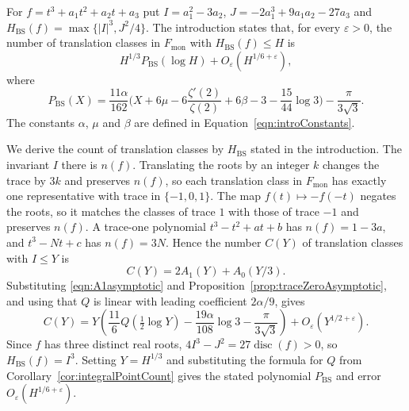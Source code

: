 \begin{remarknode}

\label{rem:translationClasses}


\leanok

For $f=t^3+a_1t^2+a_2t+a_3$ put $I=a_1^2-3a_2$, $J=-2a_1^3+9a_1a_2-27a_3$ and $H_{\mathrm{BS}}(f)=\max\{|I|^3,J^2/4\}$. The introduction states that, for every $\varepsilon>0$, the number of translation classes in $F_{\mathrm{mon}}$ with $H_{\mathrm{BS}}(f)\leq H$ is \[H^{1/3}P_{\mathrm{BS}}(\log H)+O_\varepsilon(H^{1/6+\varepsilon}),\] where \[P_{\mathrm{BS}}(X)=\frac{11\alpha}{162}\biggl(X+6\mu-6\frac{\zeta'(2)}{\zeta(2)}+6\beta-3-\frac{15}{44}\log3\biggr)-\frac{\pi}{3\sqrt3}.\] The constants $\alpha$, $\mu$ and $\beta$ are defined in Equation~\ref{eqn:introConstants}.

 We derive the count of translation classes by $H_{\mathrm{BS}}$ stated in the introduction. The invariant $I$ there is $n(f)$. Translating the roots by an integer $k$ changes the trace by $3k$ and preserves $n(f)$, so each translation class in $F_{\mathrm{mon}}$ has exactly one representative with trace in $\{-1,0,1\}$. The map $f(t)\mapsto-f(-t)$ negates the roots, so it matches the classes of trace $1$ with those of trace $-1$ and preserves $n(f)$. A trace-one polynomial $t^3-t^2+at+b$ has $n(f)=1-3a$, and $t^3-Nt+c$ has $n(f)=3N$. Hence the number $C(Y)$ of translation classes with $I\leq Y$ is \[ C(Y)=2A_1(Y)+A_0(Y/3). \] Substituting \eqref{eqn:A1asymptotic} and Proposition~\ref{prop:traceZeroAsymptotic}, and using that $Q$ is linear with leading coefficient $2\alpha/9$, gives \[ C(Y)=Y\left(\frac{11}{6}Q\left(\tfrac12\log Y\right) -\frac{19\alpha}{108}\log3-\frac{\pi}{3\sqrt3}\right) +O_\varepsilon(Y^{1/2+\varepsilon}). \] Since $f$ has three distinct real roots, $4I^3-J^2=27\operatorname{disc}(f)>0$, so $H_{\mathrm{BS}}(f)=I^3$. Setting $Y=H^{1/3}$ and substituting the formula for $Q$ from Corollary~\ref{cor:integralPointCount} gives the stated polynomial $P_{\mathrm{BS}}$ and error $O_\varepsilon(H^{1/6+\varepsilon})$. 

\end{remarknode}

